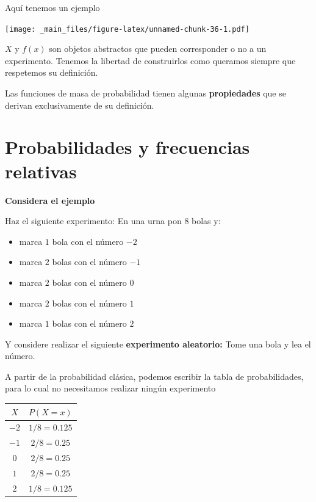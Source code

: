 \documentclass[
]{book}
\providecommand{\tightlist}{%
  \setlength{\itemsep}{0pt}\setlength{\parskip}{0pt}}
\begin{document}
Aquí tenemos un ejemplo

\texttt{[image: \_main\_files/figure-latex/unnamed-chunk-36-1.pdf]}

\(X\) y \(f(x)\) son objetos abstractos que pueden corresponder o no a un experimento. Tenemos la libertad de construirlos como queramos siempre que respetemos su definición.

Las funciones de masa de probabilidad tienen algunas \textbf{propiedades} que se derivan exclusivamente de su definición.

\hypertarget{probabilidades-y-frecuencias-relativas}{%
\section{Probabilidades y frecuencias relativas}\label{probabilidades-y-frecuencias-relativas}}

\textbf{Considera el ejemplo}

Haz el siguiente experimento: En una urna pon \(8\) bolas y:

\begin{itemize}
\tightlist
\item
  marca \(1\) bola con el número \(-2\)
\item
  marca \(2\) bolas con el número \(-1\)
\item
  marca \(2\) bolas con el número \(0\)
\item
  marca \(2\) bolas con el número \(1\)
\item
  marca \(1\) bolas con el número \(2\)
\end{itemize}

Y considere realizar el siguiente \textbf{experimento aleatorio:} Tome una bola y lea el número.

A partir de la probabilidad clásica, podemos escribir la tabla de probabilidades, para lo cual no necesitamos realizar ningún experimento

\begin{longtable}[]{@{}cc@{}}
\toprule\noalign{}
\(X\) & \(P(X=x)\) \\
\midrule\noalign{}
\endhead
\bottomrule\noalign{}
\endlastfoot
\(-2\) & \(1/8=0.125\) \\
\(-1\) & \(2/8=0.25\) \\
\(0\) & \(2/8=0.25\) \\
\(1\) & \(2/8=0.25\) \\
\(2\) & \(1/8=0.125\) \\
\end{longtable}
\end{document}
